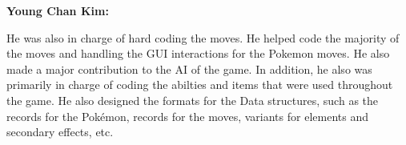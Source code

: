 \documentclass{scrreprt}
\begin{document}
\textbf{Young Chan Kim:} 
 
He was also in charge of hard coding the moves. He helped code the majority of the moves and handling the GUI interactions for the Pokemon moves. He also made a major contribution to the AI of the game. In addition, he also was primarily in charge of coding the abilties and items that were used throughout the game. He also designed the formats for the Data structures, such as the records for the Pok\'emon, records for the moves, variants for elements and secondary effects, etc.
 
\end{document}
